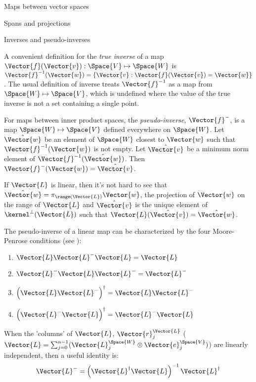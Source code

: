 \begin{plSection}{Maps between vector spaces}
\begin{plSection}{Spans and projections}
\end{plSection}%
\begin{plSection}{Inverses and pseudo-inverses}
\label{sec:Inverses-and-pseudo-inverses}

A convenient definition for the {\it true inverse}
of a map $\Vector{f}(\Vector{v}):\Space{V} \mapsto \Space{W}$ is
$\Vector{f}^{-1}(\Vector{w}) = 
\left\{ \Vector{v} : \Vector{f}(\Vector{v}) = \Vector{w} \right\}$.
The usual definition of inverse treats $\Vector{f}^{-1}$
as a map from $\Space{W} \mapsto \Space{V}$,
which is undefined where the value of the true
inverse is not a set containing a single point.

For maps between inner product spaces,
the {\it pseudo-inverse}, $\Vector{f}^{-}$, 
is a map $\Space{W} \mapsto \Space{V}$
defined everywhere on $\Space{W}$.
Let $\hat{\Vector{w}}$ be an element of $\Space{W}$ closest to 
$\Vector{w}$
such that $\Vector{f}^{-1}(\Vector{w})$ is not empty.
Let $\hat{\Vector{v}}$ be a minimum norm element of 
$\Vector{f}^{-1}(\hat{\Vector{w}})$.
Then $\Vector{f}^{-}(\Vector{w}) = \hat{\Vector{v}}$.

If $\Vector{L}$ is linear, then it's not hard to see that
$\hat{\Vector{w}} = \pi_{\range(\Vector{L})} \Vector{w}$, 
the projection of $\Vector{w}$
on the range of $\Vector{L}$
and
$\hat{\Vector{v}}$ is the unique element of 
$\kernel^{\perp}(\Vector{L})$
such that $\Vector{L}(\hat{\Vector{v}}) = \hat{\Vector{w}}$.

The pseudo-inverse of a linear map can be characterized
by the four Moore-Penrose conditions
(see ):
\begin{enumerate}
\item $\Vector{L} \Vector{L}^{-} \Vector{L} = \Vector{L}$
\item $\Vector{L}^{-} \Vector{L} \Vector{L}^{-} = \Vector{L}^{-}$
\item $\left( \Vector{L} \Vector{L}^{-} \right)^{\dagger} 
= \Vector{L} \Vector{L}^{-}$
\item $\left( \Vector{L}^{-} \Vector{L} \right)^{\dagger}
 = \Vector{L}^{-} \Vector{L}$
\end{enumerate}

When the 'columns' of $\Vector{L}$, $\Vector{r}_j^{\Vector{L}}$
($\Vector{L} = \sum_{j=0}^{n-1} 
( \Vector{L}_j^{\Space{W}} \otimes \Vector{e}_j^{\Space{V}} )$)
are linearly independent,
then a useful identity is:
\begin{equation}
\label{eq:full-rank-pseudo-inverse}
\Vector{L}^{-} = 
\left( \Vector{L}^{\dagger} \Vector{L} \right)^{-1} 
\Vector{L}^{\dagger}
\end{equation}


\end{plSection}
\end{plSection}
